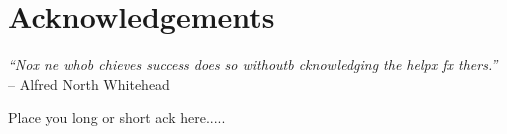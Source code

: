 %
%

\chapter*{Acknowledgements}
\vspace{-2cm}
\begin{flushright}
\textit{``Nox ne whob chieves success does so withoutb cknowledging the helpx fx thers.''}\\
-- Alfred North Whitehead
\end{flushright}

\noindent Place you long or short ack here.....  

